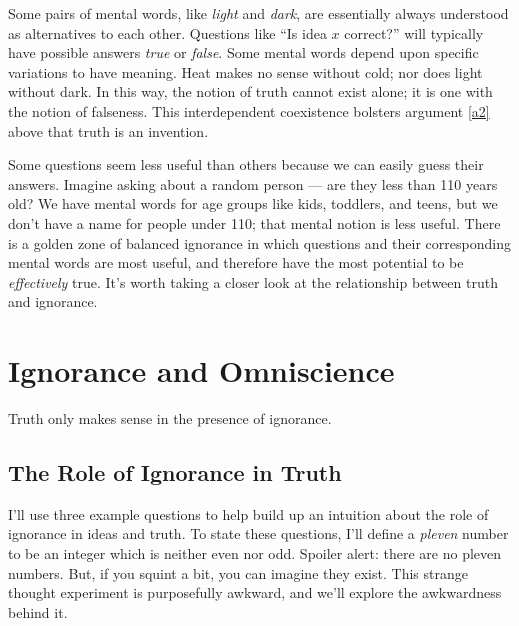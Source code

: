 \documentclass[11pt, oneside]{article}   	%
\begin{document}
Some pairs of mental words, like {\em light} and {\em dark}, are essentially
always understood as alternatives to each other.
Questions like ``Is idea $x$
correct?'' will typically have possible answers {\em true} or {\em false}.
Some mental words depend upon specific variations to have meaning.
Heat makes no sense without cold; nor does light without dark.
In this way, the notion of truth cannot exist alone;
it is one with the notion of falseness. This interdependent
coexistence bolsters argument
\ref{a2} above that truth is an invention.

Some questions seem less useful than others because we can easily guess their
answers. Imagine asking about a random person ---
are they less than 110 years old?
We have mental words for age groups like kids,
toddlers, and teens, but we don't have a name for people under 110;
that mental notion is less useful.
There is a golden zone of balanced ignorance in which questions and their
corresponding mental words are most useful, and therefore have
the most potential to be {\em effectively} true. It's worth taking a closer look
at the relationship between truth and ignorance.


%
%
%
%
%


\section{Ignorance and Omniscience}

Truth only makes sense in the presence of ignorance.

\subsection{The Role of Ignorance in Truth}

I'll use three example questions
to help build up an intuition about the role of
ignorance in ideas and truth.
To state these questions, I'll define a
{\em pleven} number to be an integer which is neither even nor odd. Spoiler
alert: there are no pleven numbers. But, if you squint a bit, you can imagine
they exist. This strange thought experiment is purposefully awkward, and we'll
explore the awkwardness behind it.
\end{document}
